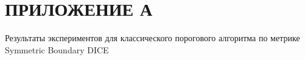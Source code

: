 \appendix
\renewcommand{\thesection}{\Asbuk{section}} 
\renewcommand{\thetable}{\thesection.\arabic{table}} 
\setcounter{table}{0}

\section*{ПРИЛОЖЕНИЕ А}
Результаты экспериментов для классического порогового алгоритма по метрике Symmetric Boundary DICE
\label{app:thresholdingBoundaryDice}

